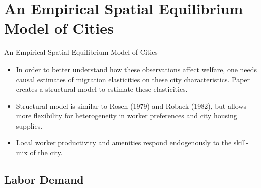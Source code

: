 \documentclass[aspectratio=169]{beamer}
\begin{document}

\section{An Empirical Spatial Equilibrium Model of Cities}


\begin{frame}{An Empirical Spatial Equilibrium Model of Cities}

\begin{itemize}
    \item<1-> In order to better understand how these observations affect welfare, one needs causal estimates of migration elasticities on these city characteristics.  Paper creates a structural model to estimate these elasticities.
    \item<2-> Structural model is similar to Rosen (1979) and Roback (1982), but allows more flexibility for heterogeneity in worker preferences and city housing supplies.
    \item<3-> Local worker productivity and amenities respond endogenously to the skill-mix of the city.
\end{itemize}
    
\end{frame}


\subsection{Labor Demand}

\end{document}

